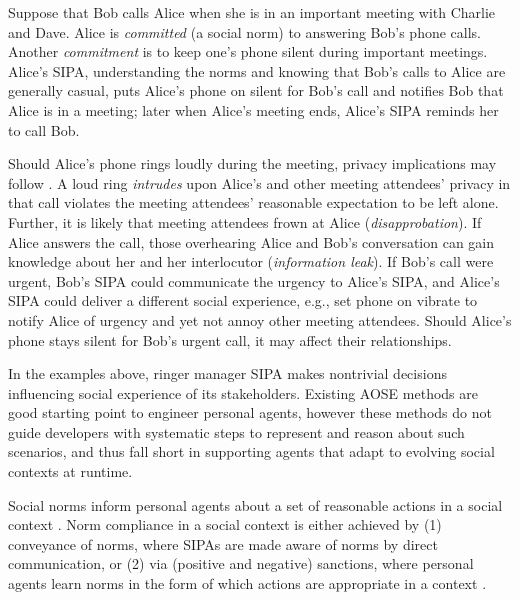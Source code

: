 \documentclass[11pt,          %
               phd,           %
               onehalfspacing %
               ]{ncsuthesis}
\begin{document}
Suppose that Bob calls Alice when she is in an important meeting with
Charlie and Dave. Alice is \emph{committed} (a social norm)
to answering Bob's phone calls. Another \emph{commitment} is to keep
one's phone silent during important meetings. Alice's SIPA,
understanding the norms and knowing that Bob's calls to Alice are
generally casual, puts Alice's phone on silent for Bob's call and
notifies Bob that Alice is in a meeting; later when Alice's meeting
ends, Alice's SIPA reminds her to call Bob.

Should Alice's phone rings loudly during the meeting, privacy
implications may follow
\citep{Murukannaiah-IC16-Engineering,solove-2006-taxonomy}. A loud ring
\emph{intrudes} upon Alice's and other meeting attendees' privacy in
that call violates the meeting attendees' reasonable expectation to be
left alone. Further, it is likely that meeting attendees frown at Alice
(\emph{disapprobation}). If Alice answers the call, those overhearing
Alice and Bob's conversation can gain knowledge about her and her
interlocutor (\emph{information leak}). If Bob's call were urgent, Bob's
SIPA could communicate the urgency to Alice's SIPA, and Alice's SIPA
could deliver a different social experience, e.g., set phone on vibrate
to notify Alice of urgency and yet not annoy other meeting attendees.
Should Alice's phone stays silent for Bob's urgent call, it may affect
their relationships.

In the examples above, ringer manager SIPA makes nontrivial decisions
influencing social experience of its stakeholders. Existing AOSE methods
\citep{Bresciani-JAAMAS04-Tropos,Winikoff-2004-DIA,Murukannaiah-AAMAS14-Xipho}
are good starting point to engineer personal agents, however these
methods do not guide developers with systematic steps to represent and
reason about such scenarios, and thus fall short in supporting agents
that adapt to evolving social contexts at runtime.

Social norms inform personal agents about a set of reasonable actions in a social
context \citep{vanRiemsdijk-AAMAS15-SociallyAdaptive}. Norm compliance in
a social context is either achieved by (1) conveyance of norms, where
SIPAs are made aware of norms by direct communication, or (2) via
(positive and negative) sanctions, where personal agents learn norms in the form
of which actions are appropriate in a context
\citep{Andrighetto-2013-PunishVoice}. 
\end{document}
